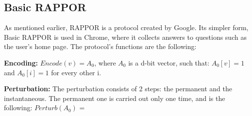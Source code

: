 \subsection{Basic RAPPOR}
As mentioned earlier, RAPPOR is a protocol created by Google. Its simpler form, Basic RAPPOR is used in Chrome, where it collects answers to questions such as the user's home page. The protocol's functions are the following:

\textbf{Encoding:} $Encode(v) = A_0$, where $A_0$ is a d-bit vector, such that: $A_0[v] = 1$ and $A_0[i] = 1$ for every other i. 

\textbf{Perturbation:} The perturbation consists of 2 steps: the permanent and the instantaneous. The permanent one is carried out only one time, and is the following: $Perturb(A_0)$ = 